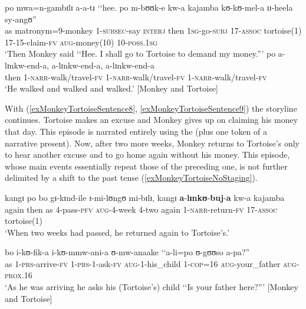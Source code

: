 \begin{exe}
\begin{xlist}
\ex \label{exMonkeyTortoiseSentence8} \gll po mwa=n-gambɪlɪ a-a-tɪ \textup{\lq\lq}hee. po m-bʊʊk-e kw-a kajamba kʊ-kʊ-mel-a ɪɪ-heela sy-angʊ\textup{''}\\
as matronym=9-monkey 1-\textsc{subsec}-say \phantom{\lq\lq}\textsc{interj} then \textsc{1sg}-go-\textsc{subj} 17-\textsc{assoc} tortoise(1) 17-15-claim-\textsc{fv} \textsc{aug}-money(10) 10-\textsc{poss.1sg}\\
\glt \lq Then Monkey said \lq\lq Hee. ‎‎I shall go to Tortoise to demand my money.''{}'
\ex \label{exMonkeyTortoiseSentence9} \gll po a-lɪnkw-end-a, a-lɪnkw-end-a, a-lɪnkw-end-a\\
then 1-\textsc{narr}-walk/travel-\textsc{fv} 1-\textsc{narr}-walk/travel-\textsc{fv} 1-\textsc{narr}-walk/travel-\textsc{fv}\\
\glt \lq He walked and walked and walked.' [Monkey and Tortoise]
\end{xlist}
\end{exe}

With (\ref{exMonkeyTortoiseSentence8}, \ref{exMonkeyTortoiseSentence9}) the storyline continues. Tortoise makes an excuse and Monkey gives up on claiming his money that day. This episode is narrated entirely using the  (plus one token of a narrative present). Now, after two more weeks, Monkey returns to Tortoise's only to hear another excuse and to go home again without his money. This episode, whose main events essentially repeat those of the preceding one, is not further delimited by a shift to the past tense (\ref{exMonkeyTortoiseNoStaging}).

\largerpage[2]
\begin{exe}
\ex \label{exMonkeyTortoiseNoStaging}
\begin{xlist}
\ex \label{exMonkeyTortoiseNoStagingSentence1} \gll kangɪ po bo gɪ-kɪnd-ile ɪ-mi-lʊngʊ mi-bɪlɪ, kangɪ \textbf{a}-\textbf{lɪnkʊ}-\textbf{buj}-\textbf{a} kw-a kajamba\\
again then as 4-pass-\textsc{pfv} \textsc{aug}-4-week 4-two again 1-\textsc{narr}-return-\textsc{fv} 17-\textsc{assoc} tortoise(1)\\
\glt \lq When two weeks had passed, he returned again to Tortoise's.'

\ex \gll bo i-kʊ-fik-a i-kʊ-mmw-ani-a ʊ-mw-anaake \lq\lq a-li=po ʊ-gʊʊso a-pa?''\\
as 1-\textsc{prs}-arrive-\textsc{fv} 1-\textsc{prs}-1-ask-\textsc{fv} \textsc{aug}-1-his\_child \phantom{\lq\lq}1-\textsc{cop}=16 \textsc{aug}-your\_father \textsc{aug}-\textsc{prox.16}\\
\glt \lq As he was arriving he asks his (Tortoise's) child \lq\lq Is your father here?''{}' [Monkey and Tortoise]
\end{xlist}
\end{exe}

